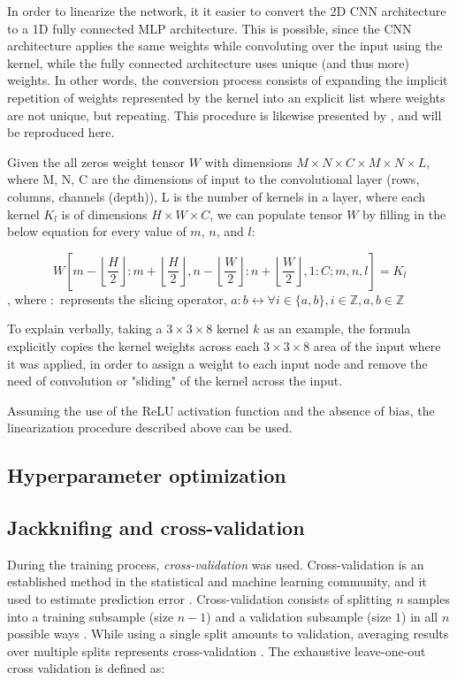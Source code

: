 In order to linearize the network, it it easier to convert the 2D CNN architecture to a 1D fully connected MLP architecture. This is possible, since the CNN architecture applies the same weights while convoluting over the input using the kernel, while the fully connected architecture uses unique (and thus more) weights. In other words, the conversion process consists of expanding the implicit repetition of weights represented by the kernel into an explicit list where weights are not unique, but repeating. This procedure is likewise presented by \textcite{keshishianEstimatingInterpretingNonlinear2020}, and will be reproduced here.

Given the all zeros weight tensor $W$ with dimensions $M \times N \times C \times M \times N \times L$, where M, N, C are the dimensions of input to the convolutional layer (rows, columns, channels (depth)), L is the number of kernels in a layer, where each kernel $K_l$ is of dimensions $H \times W \times C$, we can populate tensor $W$ by filling in the below equation for every value of $m$, $n$, and $l$:

\begin{equation}
	W\left[m - \left\lfloor\frac{H}{2}\right\rfloor:m+ \left\lfloor\frac{H}{2}\right\rfloor, n- \left\lfloor\frac{W}{2}\right\rfloor:n+ \left\lfloor\frac{W}{2}\right\rfloor, 1:C; m, n, l\right] = K_l
\end{equation} 
\noindent , where $:$ represents the slicing operator, $a:b \leftrightarrow \forall i \in \{a, b\}, i \in \mathbb{Z}, a, b \in \mathbb{Z}$

To explain verbally, taking a $3 \times 3 \times 8$ kernel $k$ as an example, the formula explicitly copies the kernel weights across each $3 \times 3 \times 8$ area of the input where it was applied, in order to assign a weight to each input node and remove the need of convolution or "sliding" of the kernel across the input.

Assuming the use of the ReLU activation function and the absence of bias, the linearization procedure described above can be used.

\subsection{Hyperparameter optimization}

\subsection{Jackknifing and cross-validation}
During the training process, \emph{cross-validation} was used. Cross-validation is an established method in the statistical and machine learning community, and it used to estimate prediction error \parencite{batesCrossValidationWhatDoes2024}. Cross-validation consists of splitting $n$ samples  into a training subsample (size $n-1$) and a validation subsample (size $1$) in all $n$ possible ways \parencite{stoneCrossValidatoryChoiceAssessment1974}.  While using a single split amounts to validation, averaging results over multiple splits represents cross-validation \parencite{arlotSurveyCrossvalidationProcedures2010}. The exhaustive leave-one-out cross validation is defined as:

